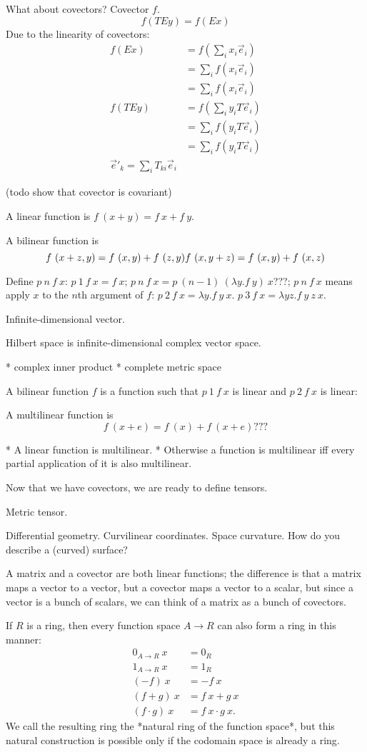What about covectors?
Covector $f$.
\[
f(TEy) = f(Ex)
\]
Due to the linearity of covectors:
\begin{align*}
f(Ex) &= f\left(\sum_i x_i \vec{e}_i\right)
\\ &= \sum_i f(x_i \vec{e}_i)
\\ &= \sum_i f(x_i \vec{e}_i)
\\ f(TEy) &= f\left(\sum_i y_i T\vec{e}_i \right)
\\ &= \sum_i f(y_i T\vec{e}_i)
\\ &= \sum_i f(y_i T\vec{e}_i)
\\ \vec{e}'_k = \sum_i T_{ki} \vec{e}_i
\end{align*}

(todo show that covector is covariant)

A linear function is $f~(x+y) = f~x + f~y$.

A bilinear function is
\[
f~(x+z,y) = f~(x,y) + f~(z,y)
\\ f~(x,y+z) = f~(x,y) + f~(x,z)
\]

Define $p~n~f~x$:
$p~1~f~x = f~x$;
$p~n~f~x = p~(n-1)~(\lambda y. f~y)~x$???;
$p~n~f~x$ means apply $x$ to the $n$th argument of $f$:
$p~2~f~x = \lambda y. f~y~x$.
$p~3~f~x = \lambda y z. f~y~z~x$.

Infinite-dimensional vector.

Hilbert space is infinite-dimensional complex vector space.

* complex inner product
* complete metric space

A bilinear function $f$ is a function such that $p~1~f~x$ is linear
and $p~2~f~x$ is linear:

A multilinear function is
\[
f~(x + e) = f~(x) + f~(x + e)???
\]

* A linear function is multilinear.
* Otherwise a function is multilinear iff every partial application of it is also multilinear.

Now that we have covectors, we are ready to define tensors.

Metric tensor.

Differential geometry. Curvilinear coordinates. Space curvature.
How do you describe a (curved) surface?

A matrix and a covector are both linear functions;
the difference is that a matrix maps a vector to a vector,
but a covector maps a vector to a scalar,
but since a vector is a bunch of scalars,
we can think of a matrix as a bunch of covectors.

If $R$ is a ring, then every function space $A \to R$ can also form a ring in this manner:
\begin{align*}
0_{A\to R}~x &= 0_R
\\ 1_{A\to R}~x &= 1_R
\\ (- f)~x &= - f~x
\\ (f + g)~x &= f~x + g~x
\\ (f \cdot g)~x &= f~x \cdot g~x.
\end{align*}
We call the resulting ring the *natural ring of the function space*,
but this natural construction is possible only if the codomain space is already a ring.

